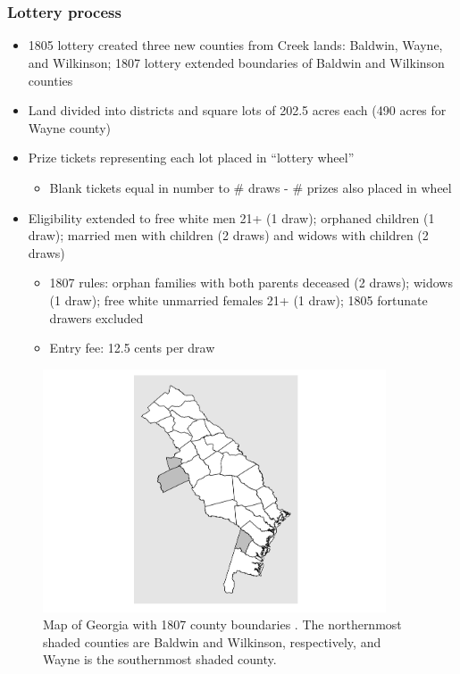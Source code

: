\documentclass{beamer}
\begin{document}
\section[Georgia land lotteries]{}

\begin{frame}
\frametitle{Lottery process}
\begin{itemize}
\item 1805 lottery created three new counties from Creek lands: Baldwin, Wayne, and Wilkinson; 1807 lottery extended boundaries of Baldwin and Wilkinson counties
\item Land divided into districts and square lots of 202.5 acres each (490 acres for Wayne county)
\item Prize tickets representing each lot placed in ``lottery wheel''
\begin{itemize}
\item Blank tickets equal in number to \# draws - \# prizes also placed in wheel
\end{itemize}
\item Eligibility extended to free white men 21+ (1 draw); orphaned children (1 draw); married men with children (2 draws) and widows with children (2 draws)
\begin{itemize}
\item 1807 rules: orphan families with both parents deceased (2 draws); widows (1 draw); free white unmarried females 21+ (1 draw); 1805 fortunate drawers excluded
\item Entry fee: 12.5 cents per draw
\end{itemize}
\end{itemize}
\end{frame}

\begin{frame}
\begin{figure}[htbp] 
   \centering
   \includegraphics[width=4in]{county-map.pdf} 
   \caption{Map of Georgia with 1807 county boundaries \citep{long1995}. The northernmost shaded counties are Baldwin and Wilkinson, respectively, and Wayne is the southernmost shaded county.}
   \label{map}
\end{figure}
\end{frame}
\end{document}

